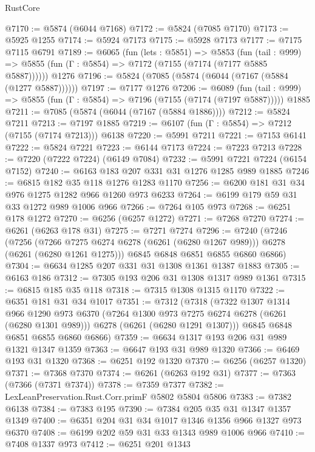 \begin{lexlean}{RustCore}
\begin{coremodule}
@7170 := @5874 (@6044 @7168)
@7172 := @5824 (@7085 @7170)
@7173 := @5925 @1255
@7174 := @5924 @7173
@7175 := @5928 @7173
@7177 := @7175 @7115 @6791
@7189 := @6065
    (fun (lets : @5851) =>
    @5853
      (fun (tail : @999) => @5855 (fun (Γ : @5854) => @7172 (@7155 (@7174 (@7177 @5885 @5887))))))
    @1276
@7196 := @5824 (@7085 (@5874 (@6044 (@7167 (@5884 (@1277 @5887))))))
@7197 := @7177 @1276
@7206 := @6089
    (fun (tail : @999) => @5855 (fun (Γ : @5854) => @7196 (@7155 (@7174 (@7197 @5887)))))
    @1885
@7211 := @7085 (@5874 (@6044 (@7167 (@5884 @1886))))
@7212 := @5824 @7211
@7213 := @7197 @1885
@7219 := @6107 (fun (Γ : @5854) => @7212 (@7155 (@7174 @7213))) @6138
@7220 := @5991 @7211
@7221 := @7153 @6141
@7222 := @5824 @7221
@7223 := @6144 @7173
@7224 := @7223 @7213
@7228 := @7220 (@7222 @7224) (@6149 @7084)
@7232 := @5991 @7221 @7224 (@6154 @7152)
@7240 := @6163 @183 @207 @331 @31 @1276 @1285 @989 @1885
@7246 := @6815 @182 @35 @118 @1276 @1283 @1170
@7256 := @6200 @181 @31 @34 @976 @1275 @1282 @966 @1260 @973 @6233
@7264 := @6199 @179 @59 @31 @33 @1272 @989 @1006 @966
@7266 := @7264 @105 @973
@7268 := @6251 @178 @1272
@7270 := @6256 (@6257 @1272)
@7271 := @7268 @7270
@7274 := @6261 (@6263 @178 @31)
@7275 := @7271 @7274
@7296 := @7240
    (@7246
      (@7256 (@7266 @7275 @6274 @6278 (@6261 (@6280 @1267 @989))) @6278 (@6261 (@6280 @1261 @1275)))
      @6845
      @6848
      @6851
      @6855
      @6860
      @6866)
@7304 := @6634 @1285 @207 @331 @31 @1308 @1361 @1387 @1883
@7305 := @6163 @186
@7312 := @7305 @193 @206 @31 @1308 @1317 @989 @1361
@7315 := @6815 @185 @35 @118
@7318 := @7315 @1308 @1315 @1170
@7322 := @6351 @181 @31 @34 @1017
@7351 := @7312
    (@7318
      (@7322
        @1307
        @1314
        @966
        @1290
        @973
        @6370
        (@7264 @1300 @973 @7275 @6274 @6278 (@6261 (@6280 @1301 @989)))
        @6278
        (@6261 (@6280 @1291 @1307)))
      @6845
      @6848
      @6851
      @6855
      @6860
      @6866)
@7359 := @6634 @1317 @193 @206 @31 @989 @1321 @1347 @1359
@7363 := @6647 @193 @31 @989 @1320
@7366 := @6469 @193 @31 @1320
@7368 := @6251 @192 @1320
@7370 := @6256 (@6257 @1320)
@7371 := @7368 @7370
@7374 := @6261 (@6263 @192 @31)
@7377 := @7363 (@7366 (@7371 @7374))
@7378 := @7359 @7377
@7382 := LexLeanPreservation.Rust.Corr.primF @5802 @5804 @5806
@7383 := @7382 @6138
@7384 := @7383 @195
@7390 := @7384 @205 @35 @31 @1347 @1357 @1349
@7400 := @6351 @204 @31 @34 @1017 @1346 @1356 @966 @1327 @973 @6370
@7408 := @6199 @202 @59 @31 @33 @1343 @989 @1006 @966
@7410 := @7408 @1337 @973
@7412 := @6251 @201 @1343

\end{coremodule}
\end{lexlean}
